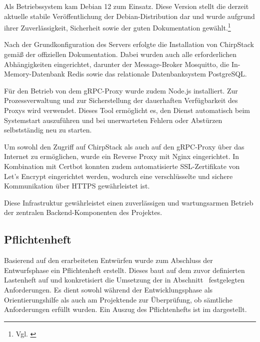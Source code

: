 	Als Betriebssystem kam Debian 12 zum Einsatz.
	Diese Version stellt die derzeit aktuelle stabile Veröffentlichung der Debian-Distribution dar und wurde aufgrund ihrer Zuverlässigkeit,
	Sicherheit sowie der guten Dokumentation gewählt.\footnote{Vgl. \citet{Debian}}

	Nach der Grundkonfiguration des Servers erfolgte die Installation von ChirpStack gemäß der offiziellen Dokumentation.
	Dabei wurden auch alle erforderlichen Abhängigkeiten eingerichtet, darunter der Message-Broker Mosquitto,
	die In-Memory-Datenbank Redis sowie das relationale Datenbanksystem PostgreSQL.
	
	Für den Betrieb von dem gRPC-Proxy wurde zudem Node.js installiert.
	Zur Prozessverwaltung und zur Sicherstellung der dauerhaften Verfügbarkeit des Proxys wird  verwendet.
	Dieses Tool ermöglicht es, den Dienst automatisch beim Systemstart auszuführen und bei unerwarteten Fehlern
	oder Abstürzen selbstständig neu zu starten.

	Um sowohl den Zugriff auf ChirpStack als auch auf den gRPC-Proxy über das Internet zu ermöglichen,
	wurde ein Reverse Proxy mit Nginx eingerichtet. In Kombination mit Certbot konnten zudem automatisierte SSL-Zertifikate
	von Let's Encrypt eingerichtet werden, wodurch eine verschlüsselte und sichere Kommunikation über HTTPS gewährleistet ist.

	Diese Infrastruktur gewährleistet einen zuverlässigen und wartungsarmen Betrieb der zentralen Backend-Komponenten des Projektes.


\subsection{Pflichtenheft}
\label{sec:Pflichtenheft}
	Basierend auf den erarbeiteten Entwürfen wurde zum Abschluss der Entwurfsphase ein Pflichtenheft erstellt.
	Dieses baut auf dem zuvor definierten Lastenheft auf und konkretisiert die Umsetzung der in Abschnitt~ festgelegten Anforderungen.
	Es dient sowohl während der Entwicklungsphase als Orientierungshilfe als auch am Projektende zur Überprüfung, ob sämtliche Anforderungen
	erfüllt wurden. Ein Auszug des Pflichtenhefts ist im  dargestellt.
